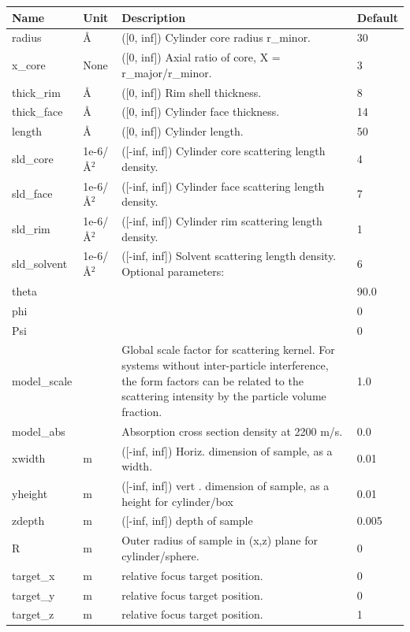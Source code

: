 \begin{longtable}{p{}p{}p{}p{}}
\toprule
\textbf{Name} & \textbf{Unit} & \textbf{Description} & \textbf{Default} \\
\midrule
\endhead
radius & \AA{} & ([0, inf]) Cylinder core radius r\_minor. & 30 \\
x\_core & None & ([0, inf]) Axial ratio of core, X = r\_major/r\_minor. & 3 \\
thick\_rim & \AA{} & ([0, inf]) Rim shell thickness. & 8 \\
thick\_face & \AA{} & ([0, inf]) Cylinder face thickness. & 14 \\
length & \AA{} & ([0, inf]) Cylinder length. & 50 \\
sld\_core & 1e-6/\AA{}$^{2}$ & ([-inf, inf]) Cylinder core scattering length density. & 4 \\
sld\_face & 1e-6/\AA{}$^{2}$ & ([-inf, inf]) Cylinder face scattering length density. & 7 \\
sld\_rim & 1e-6/\AA{}$^{2}$ & ([-inf, inf]) Cylinder rim scattering length density. & 1 \\
sld\_solvent & 1e-6/\AA{}$^{2}$ & ([-inf, inf]) Solvent scattering length density. Optional parameters: & 6 \\
theta &  &  & 90.0 \\
phi &  &  & 0 \\
Psi &  &  & 0 \\
model\_scale &   & Global scale factor for scattering kernel. For systems without inter-particle interference, the form factors can be related to the scattering intensity by the particle volume fraction. & 1.0 \\
model\_abs &   & Absorption cross section density at 2200 m/s. & 0.0 \\
xwidth & m & ([-inf, inf]) Horiz. dimension of sample, as a width. & 0.01 \\
yheight & m & ([-inf, inf]) vert . dimension of sample, as a height for cylinder/box & 0.01 \\
zdepth & m & ([-inf, inf]) depth of sample & 0.005 \\
R & m & Outer radius of sample in (x,z) plane for cylinder/sphere. & 0 \\
target\_x & m & relative focus target position. & 0 \\
target\_y & m & relative focus target position. & 0 \\
target\_z & m & relative focus target position. & 1 \\

\end{longtable}
